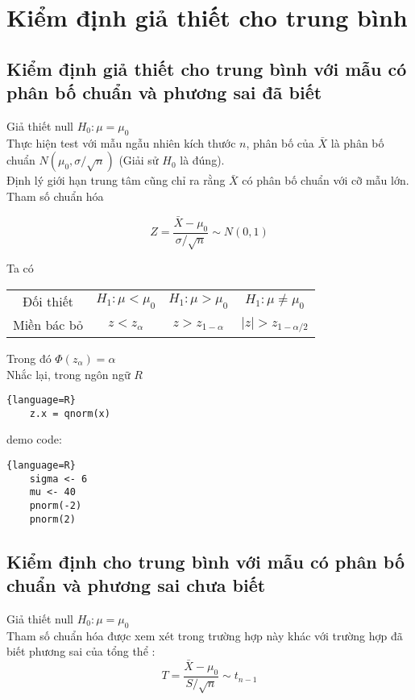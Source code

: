 \chapter{ Kiểm định giả thiết cho trung bình }

\section{Kiểm định giả thiết cho trung bình với mẫu có phân bố chuẩn và phương sai đã biết}
Giả thiết null $H_0: \mu = \mu_0$ \\
Thực hiện test với mẫu ngẫu nhiên kích thước $n$, phân bố của $\bar{X}$ là phân bố chuẩn $N(\mu_0, \sigma / \sqrt{n})$
(Giải sử $H_0$ là đúng). \\
Định lý giới hạn trung tâm cũng chỉ ra rằng $\bar{X}$ có phân bố chuẩn với cỡ mẫu lớn. \\
Tham số chuẩn hóa 

$$Z = \frac{\bar{X} - \mu_0}{\sigma / \sqrt{n}} \sim N(0, 1)$$

Ta có

\begin{center}
    \begin{tabular}{| c | c | c | c |}
        \hline
        Đối thiết & $H_1: \mu < \mu_0$ & $H_1: \mu > \mu_0$ & $H_1: \mu \neq \mu_0$ \\
        Miền bác bỏ & $z < z_{\alpha}$ & $z > z_{1-\alpha}$ & $\lvert z \rvert > z_{1 - \alpha / 2}$ \\
        \hline
    \end{tabular}
\end{center}

Trong đó $\Phi(z_\alpha) = \alpha$ \\
Nhắc lại, trong ngôn ngữ $R$
\begin{lstlisting}{language=R}
    z.x = qnorm(x)
\end{lstlisting}

demo code: 
\begin{lstlisting}{language=R}
    sigma <- 6
    mu <- 40
    pnorm(-2)
    pnorm(2)
\end{lstlisting}


\section{Kiểm định cho trung bình với mẫu có phân bố chuẩn và phương sai chưa biết}

Giả thiết null $H_0: \mu = \mu_0$ \\
Tham số chuẩn hóa được xem xét trong trường hợp này khác với trường hợp đã biết phương sai của tổng thể
:
$$T = \frac{\bar{X} - \mu_0}{S/ \sqrt{n}} \sim t_{n - 1}$$

